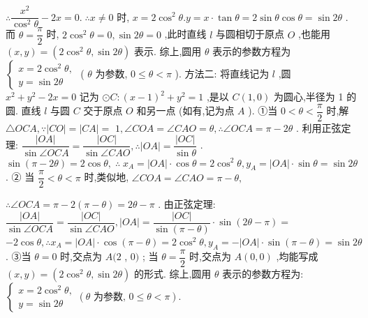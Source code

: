 $\therefore \dfrac{{x}^{2}}{{\cos }^{2}\theta } - {2x} = 0.\;\therefore x \neq  0$ 时, $x = 2{\cos }^{2}\theta .y = x \cdot  \tan \theta  = 2\sin \theta \cos \theta  = \sin {2\theta }$ . 而 $\theta  = \dfrac{\pi }{2}$ 时, $2{\cos }^{2}\theta  = 0,\sin {2\theta } = 0$ ,此时直线 $l$ 与圆相切于原点 $O$ ,也能用 $\left( {x,y}\right)  = \left( {2{\cos }^{2}\theta ,\sin {2\theta }}\right)$ 表示. 综上,圆用 $\theta$ 表示的参数方程为 $\left\{  \begin{array}{l} x = 2{\cos }^{2}\theta , \\  y = \sin {2\theta } \end{array}\right.$ ( $\theta$ 为参数, $0 \leq  \theta  < \pi$ ). 方法二: 将直线记为 $l$ ,圆 ${x}^{2} + {y}^{2} - {2x} = 0$ 记为 $\odot  C : {\left( x - 1\right) }^{2} + {y}^{2} = 1$ ,是以 $C\left( {1,0}\right)$ 为圆心,半径为 1 的圆. 直线 $l$ 与圆 $C$ 交于原点 $O$ 和另一点 (如有,记为点 $A$ ). ①当 $0 < \theta  < \dfrac{\pi }{2}$ 时,解 $\bigtriangleup  {OCA},\because \left| {CO}\right|  = \left| {CA}\right|  =$  $1,\angle {COA} = \angle {CAO} = \theta ,\therefore \angle {OCA} = \pi  - {2\theta }$ . 利用正弦定理: $\dfrac{\left| OA\right| }{\sin \angle {OCA}} = \dfrac{\left| OC\right| }{\sin \angle {CAO}},\therefore \left| {OA}\right|  = \dfrac{\left| OC\right| }{\sin \theta }$ . $\sin \left( {\pi  - {2\theta }}\right)  = 2\cos \theta ,\;\therefore \;{x}_{A} = \left| {OA}\right|  \cdot  \cos \theta  = 2{\cos }^{2}\theta ,{y}_{A} = \left| {OA}\right|  \cdot  \sin \theta  = \sin {2\theta }$ . ② 当 $\dfrac{\pi }{2} < \theta  < \pi$ 时,类似地, $\angle {COA} = \angle {CAO} = \pi  - \theta ,$

$\therefore \angle {OCA} = \pi  - 2\left( {\pi  - \theta }\right)  = {2\theta } - \pi$ . 由正弦定理: $\dfrac{\left| OA\right| }{\sin \angle {OCA}} = \dfrac{\left| OC\right| }{\sin \angle {CAO}},\left| {OA}\right|  = \dfrac{\left| OC\right| }{\sin \left( {\pi  - \theta }\right) } \cdot  \sin \left( {{2\theta } - \pi }\right)  =$  $- 2\cos \theta ,\therefore {x}_{A} = \left| {OA}\right|  \cdot  \cos \left( {\pi  - \theta }\right)  = 2{\cos }^{2}\theta ,{y}_{A} =  - \left| {OA}\right|  \cdot  \sin \left( {\pi  - \theta }\right)  = \sin {2\theta }$ . ③当 $\theta  = 0$ 时,交点为 $A(2$ , $0)$ ; 当 $\theta  = \dfrac{\pi }{2}$ 时,交点为 $A\left( {0,0}\right)$ ,均能写成 $\left( {x,y}\right)  = \left( {2{\cos }^{2}\theta ,\sin {2\theta }}\right)$ 的形式. 综上,圆用 $\theta$ 表示的参数方程为: $\left\{  {\begin{array}{l} x = 2{\cos }^{2}\theta , \\  y = \sin {2\theta } \end{array}\left( {\theta \text{ 为参数, }0 \leq  \theta  < \pi }\right) .}\right.$

